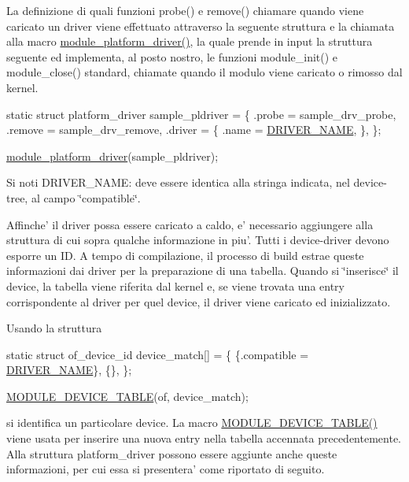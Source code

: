 La definizione di quali funzioni probe() e remove() chiamare quando viene caricato un driver viene effettuato attraverso la seguente struttura e la chiamata alla macro \hyperlink{group___kernel-_module_ga61e890be90fe5582db8048893ca0ebbf}{module\+\_\+platform\+\_\+driver()}, la quale prende in input la struttura seguente ed implementa, al posto nostro, le funzioni module\+\_\+init() e module\+\_\+close() standard, chiamate quando il modulo viene caricato o rimosso dal kernel.


\begin{DoxyCode}
\textcolor{keyword}{static} \textcolor{keyword}{struct }platform\_driver sample\_pldriver = \{
    .probe  = sample\_drv\_probe,
    .remove = sample\_drv\_remove,
    .driver = \{
        .name  = \hyperlink{group___kernel-_module_ga25634d21648ca7fb7a2aca614bafaaeb}{DRIVER\_NAME},
    \},
\};

\hyperlink{group___kernel-_module_ga61e890be90fe5582db8048893ca0ebbf}{module\_platform\_driver}(sample\_pldriver);
\end{DoxyCode}


Si noti D\+R\+I\+V\+E\+R\+\_\+\+N\+A\+M\+E\+: deve essere identica alla stringa indicata, nel device-\/tree, al campo \char`\"{}compatible\char`\"{}.

Affinche' il driver possa essere caricato a caldo, e' necessario aggiungere alla struttura di cui sopra qualche informazione in piu'. Tutti i device-\/driver devono esporre un I\+D. A tempo di compilazione, il processo di build estrae queste informazioni dai driver per la preparazione di una tabella. Quando si \char`\"{}inserisce\char`\"{} il device, la tabella viene riferita dal kernel e, se viene trovata una entry corrispondente al driver per quel device, il driver viene caricato ed inizializzato.

Usando la struttura


\begin{DoxyCode}
\textcolor{keyword}{static} \textcolor{keyword}{struct }of\_device\_id device\_match[] = \{
        \{.compatible = \hyperlink{group___kernel-_module_ga25634d21648ca7fb7a2aca614bafaaeb}{DRIVER\_NAME}\},
        \{\},
\};

\hyperlink{group___kernel-_module_ga4982cc224a0881ae5d106fce7526fb68}{MODULE\_DEVICE\_TABLE}(of, device\_match);
\end{DoxyCode}


si identifica un particolare device. La macro \hyperlink{group___kernel-_module_ga4982cc224a0881ae5d106fce7526fb68}{M\+O\+D\+U\+L\+E\+\_\+\+D\+E\+V\+I\+C\+E\+\_\+\+T\+A\+B\+L\+E()} viene usata per inserire una nuova entry nella tabella accennata precedentemente. Alla struttura platform\+\_\+driver possono essere aggiunte anche queste informazioni, per cui essa si presentera' come riportato di seguito.


